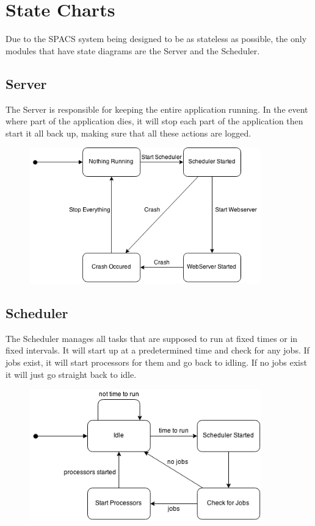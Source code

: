 \section{State Charts}

\par
Due to the SPACS system being designed to be as stateless as possible, the only modules that have state diagrams are the Server and the Scheduler.

\subsection{Server}
\par
The Server is responsible for keeping the entire application running. In the event where part of the application dies, it will stop each part of the application then start it all back up, making sure that all these actions are logged.

\begin{figure}[!ht]
\begin{center}
	\includegraphics[width=10cm]{images/statechart_server}
	\caption{}
\end{center}
\end{figure}
\FloatBarrier

\subsection{Scheduler}
\par
The Scheduler manages all tasks that are supposed to run at fixed times or in fixed intervals. It will start up at a predetermined time and check for any jobs. If jobs exist, it will start processors for them and go back to idling. If no jobs exist it will just go straight back to idle.

\begin{figure}[!ht]
\begin{center}
	\includegraphics[width=10cm]{images/statechart_scheduler}
	\caption{}
\end{center}
\end{figure}
\FloatBarrier